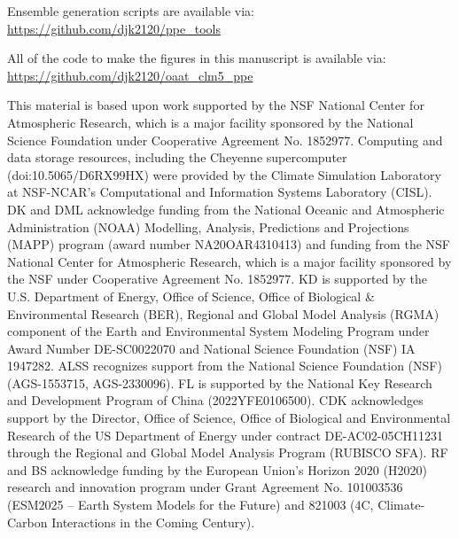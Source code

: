 \documentclass[draft]{agujournal2019}
\begin{document}
Ensemble generation scripts are available via: \\
\url{https://github.com/djk2120/ppe_tools}

All of the code to make the figures in this manuscript is available via: \\
\url{https://github.com/djk2120/oaat_clm5_ppe}






\acknowledgments
This material is based upon work supported by the NSF National Center for Atmospheric Research, which is a major facility sponsored by the National Science Foundation under Cooperative Agreement No. 1852977. Computing and data storage resources, including the Cheyenne supercomputer (doi:10.5065/D6RX99HX) were provided by the Climate Simulation Laboratory at NSF-NCAR’s Computational and Information Systems Laboratory (CISL). DK and DML acknowledge funding from the National Oceanic and Atmospheric Administration (NOAA) Modelling, Analysis, Predictions and Projections (MAPP) program (award number NA20OAR4310413) and funding from the NSF National Center for Atmospheric Research, which is a major facility sponsored by the NSF under Cooperative Agreement No. 1852977. KD is supported by the U.S. Department of Energy, Office of Science, Office of Biological \& Environmental Research (BER), Regional and Global Model Analysis (RGMA) component of the Earth and Environmental System Modeling Program under Award Number DE-SC0022070 and National Science Foundation (NSF) IA 1947282. ALSS recognizes support from the National Science Foundation (NSF) (AGS-1553715, AGS-2330096). FL is supported by the National Key Research and Development Program of China (2022YFE0106500). CDK acknowledges support by the Director, Office of Science, Office of Biological and Environmental Research of the US Department of Energy under contract DE-AC02-05CH11231 through the Regional and Global Model Analysis Program (RUBISCO SFA). RF and BS acknowledge funding by the European Union’s Horizon 2020 (H2020) research and innovation program under Grant Agreement No. 101003536 (ESM2025 – Earth System Models for the Future) and 821003 (4C, Climate-Carbon Interactions in the Coming Century).




\end{document}
